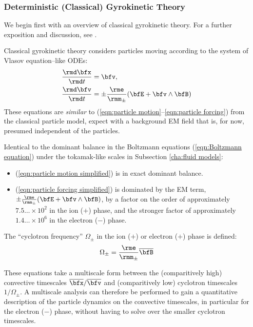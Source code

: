 \subsubsection*{Deterministic (Classical) Gyrokinetic Theory}
    We begin first with an overview of classical gyrokinetic theory. For a further exposition and discussion, see \cite{Woods_2006, Freidberg_2008, Chen_2015}.

    Classical gyrokinetic theory considers particles moving according to the system of Vlasov equation--like ODEs:
    \begin{align}
        \frac{\rmd\bfx}{\rmd t}  &=  \bfv,  \label{eqn:particle motion simplified}  \\
        \frac{\rmd\bfv}{\rmd t}  &=  \pm\frac{\rme}{\rmm_{\pm}}(\bfE + \bfv\wedge\bfB)  \label{eqn:particle forcing simplified}
    \end{align}
    These equations are \emph{similar} to (\ref{eqn:particle motion}--\ref{eqn:particle forcing}) from the classical particle model, expect with a background EM field that is, for now, presumed independent of the particles.
    
    Identical to the dominant balance in the Boltzmann equations (\ref{eqn:Boltzmann equation}) under the tokamak-like scales in Subsection \ref{cha:fluid models}:
    \begin{itemize}
        \item  (\ref{eqn:particle motion simplified}) is in exact dominant balance.
        \item  (\ref{eqn:particle forcing simplified}) is dominated by the EM term, $\pm\frac{\rme}{\rmm_{\pm}}(\bfE + \bfv\wedge\bfB)$, by a factor on the order of approximately $7.5\ldots\times 10^{2}$ in the ion ($+$) phase, and the stronger factor of approximately $1.4\ldots\times 10^{6}$ in the electron ($-$) phase. 
    \end{itemize}

    \begin{definition}
        The ``cyclotron frequency'' $\Omega_{\pm}$ in the ion ($+$) or electron ($+$) phase is defined: 
        \begin{equation}
            \Omega_{\pm}  =  \frac{\rme}{\rmm_{\pm}}\overline{\bfB}
        \end{equation}
    \end{definition}
    
    These equations take a multiscale form between the (comparitively high) convective timescales $\overline{\bfx}/\overline{\bfv}$ and (comparitively low) cyclotron timescales $1/\Omega_{\pm}$. A multiscale analysis \cite{Kevorkin_Cole_2012} can therefore be performed to gain a quantitative description of the particle dynamics on the convective timescales, in particular for the electron ($-$) phase, without having to solve over the smaller cyclotron timescales.

